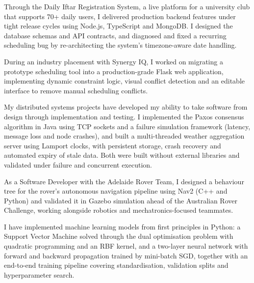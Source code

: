 \documentclass[letterpaper,11pt]{article}
\begin{document}
Through the Daily Iftar Registration System, a live platform for a university club that supports 70+ daily users, I delivered production backend features under tight release cycles using Node.js, TypeScript and MongoDB. I designed the database schemas and API contracts, and diagnosed and fixed a recurring scheduling bug by re-architecting the system's timezone-aware date handling. 

During an industry placement with Synergy IQ, I worked on migrating a prototype scheduling tool into a production-grade Flask web application, implementing dynamic constraint logic, visual conflict detection and an editable interface to remove manual scheduling conflicts. 

My distributed systems projects have developed my ability to take software from design through implementation and testing. I implemented the Paxos consensus algorithm in Java using TCP sockets and a failure simulation framework (latency, message loss and node crashes), and built a multi-threaded weather aggregation server using Lamport clocks, with persistent storage, crash recovery and automated expiry of stale data. Both were built without external libraries and validated under failure and concurrent execution. 

As a Software Developer with the Adelaide Rover Team, I designed a behaviour tree for the rover's autonomous navigation pipeline using Nav2 (C++ and Python) and validated it in Gazebo simulation ahead of the Australian Rover Challenge, working alongside robotics and mechatronics-focused teammates. 

I have implemented machine learning models from first principles in Python: a Support Vector Machine solved through the dual optimisation problem with quadratic programming and an RBF kernel, and a two-layer neural network with forward and backward propagation trained by mini-batch SGD, together with an end-to-end training pipeline covering standardisation, validation splits and hyperparameter search. 
\end{document}
